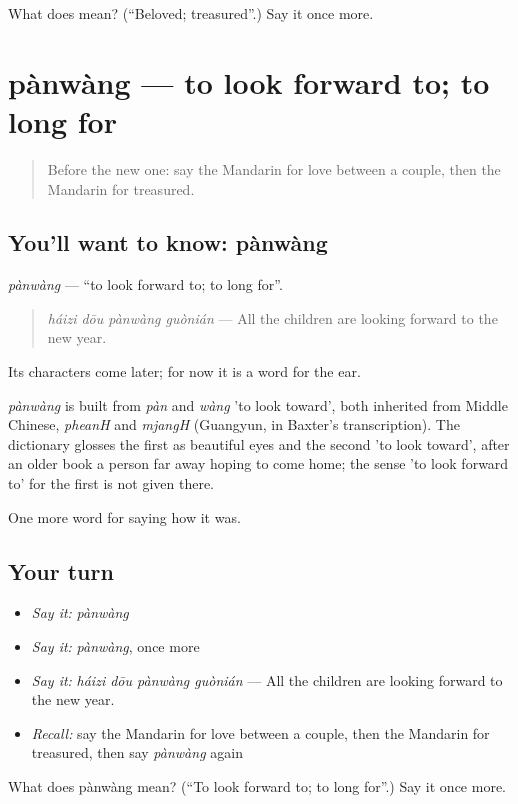 \begin{tcolorbox}[breakable,colback=teal!4,colframe=teal!35!black,title={Before you move on}]
What does  mean? (\textquotedblleft{}Beloved; treasured\textquotedblright{}.) Say it once more.
\end{tcolorbox}
\section[pànwàng]{pànwàng — to look forward to; to long for}

\label{lesson:ZH-C461-panwang}



\begin{quote}
Before the new one: say the Mandarin for love between a couple, then the Mandarin for treasured.
\end{quote}

\subsection*{You'll want to know: pànwàng}
\emph{pànwàng} — \textquotedblleft{}to look forward to; to long for\textquotedblright{}.

\begin{quote}
\emph{háizi dōu pànwàng guònián} — All the children are looking forward to the new year.
\end{quote}

Its characters come later; for now it is a word for the ear.

\begin{cousinweb}
\emph{pànwàng} is built from \emph{pàn} and \emph{wàng} 'to look toward', both inherited from Middle Chinese, \emph{pheanH} and \emph{mjangH} (Guangyun, in Baxter's transcription). The dictionary glosses the first as beautiful eyes and the second 'to look toward', after an older book a person far away hoping to come home; the sense 'to look forward to' for the first is not given there.
\end{cousinweb}

\begin{grammarlens}[title={What you've built}]
One more word for saying how it was.
\end{grammarlens}

\subsection*{Your turn}
\begin{itemize}
\raggedright
  \item \emph{Say it:} \emph{pànwàng}
  \item \emph{Say it:} \emph{pànwàng}, once more
  \item \emph{Say it:} \emph{háizi dōu pànwàng guònián} — All the children are looking forward to the new year.
  \item \emph{Recall:} say the Mandarin for love between a couple, then the Mandarin for treasured, then say \emph{pànwàng} again
\end{itemize}

\begin{tcolorbox}[breakable,colback=teal!4,colframe=teal!35!black,title={Before you move on}]
What does pànwàng mean? (\textquotedblleft{}To look forward to; to long for\textquotedblright{}.) Say it once more.
\end{tcolorbox}
